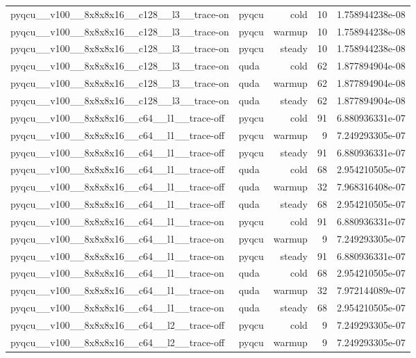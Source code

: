 \begin{table}[htbp]
\begin{tabular}{@{}llrrr@{}}
pyqcu\_\_v100\_\_8x8x8x16\_\_c128\_\_l3\_\_trace-on & pyqcu & cold & 10 & 1.758944238e-08 \\
pyqcu\_\_v100\_\_8x8x8x16\_\_c128\_\_l3\_\_trace-on & pyqcu & warmup & 10 & 1.758944238e-08 \\
pyqcu\_\_v100\_\_8x8x8x16\_\_c128\_\_l3\_\_trace-on & pyqcu & steady & 10 & 1.758944238e-08 \\
pyqcu\_\_v100\_\_8x8x8x16\_\_c128\_\_l3\_\_trace-on & quda & cold & 62 & 1.877894904e-08 \\
pyqcu\_\_v100\_\_8x8x8x16\_\_c128\_\_l3\_\_trace-on & quda & warmup & 62 & 1.877894904e-08 \\
pyqcu\_\_v100\_\_8x8x8x16\_\_c128\_\_l3\_\_trace-on & quda & steady & 62 & 1.877894904e-08 \\
pyqcu\_\_v100\_\_8x8x8x16\_\_c64\_\_l1\_\_trace-off & pyqcu & cold & 91 & 6.880936331e-07 \\
pyqcu\_\_v100\_\_8x8x8x16\_\_c64\_\_l1\_\_trace-off & pyqcu & warmup & 9 & 7.249293305e-07 \\
pyqcu\_\_v100\_\_8x8x8x16\_\_c64\_\_l1\_\_trace-off & pyqcu & steady & 91 & 6.880936331e-07 \\
pyqcu\_\_v100\_\_8x8x8x16\_\_c64\_\_l1\_\_trace-off & quda & cold & 68 & 2.954210505e-07 \\
pyqcu\_\_v100\_\_8x8x8x16\_\_c64\_\_l1\_\_trace-off & quda & warmup & 32 & 7.968316408e-07 \\
pyqcu\_\_v100\_\_8x8x8x16\_\_c64\_\_l1\_\_trace-off & quda & steady & 68 & 2.954210505e-07 \\
pyqcu\_\_v100\_\_8x8x8x16\_\_c64\_\_l1\_\_trace-on & pyqcu & cold & 91 & 6.880936331e-07 \\
pyqcu\_\_v100\_\_8x8x8x16\_\_c64\_\_l1\_\_trace-on & pyqcu & warmup & 9 & 7.249293305e-07 \\
pyqcu\_\_v100\_\_8x8x8x16\_\_c64\_\_l1\_\_trace-on & pyqcu & steady & 91 & 6.880936331e-07 \\
pyqcu\_\_v100\_\_8x8x8x16\_\_c64\_\_l1\_\_trace-on & quda & cold & 68 & 2.954210505e-07 \\
pyqcu\_\_v100\_\_8x8x8x16\_\_c64\_\_l1\_\_trace-on & quda & warmup & 32 & 7.972144089e-07 \\
pyqcu\_\_v100\_\_8x8x8x16\_\_c64\_\_l1\_\_trace-on & quda & steady & 68 & 2.954210505e-07 \\
pyqcu\_\_v100\_\_8x8x8x16\_\_c64\_\_l2\_\_trace-off & pyqcu & cold & 9 & 7.249293305e-07 \\
pyqcu\_\_v100\_\_8x8x8x16\_\_c64\_\_l2\_\_trace-off & pyqcu & warmup & 9 & 7.249293305e-07 \\

\end{tabular}
\end{table}
